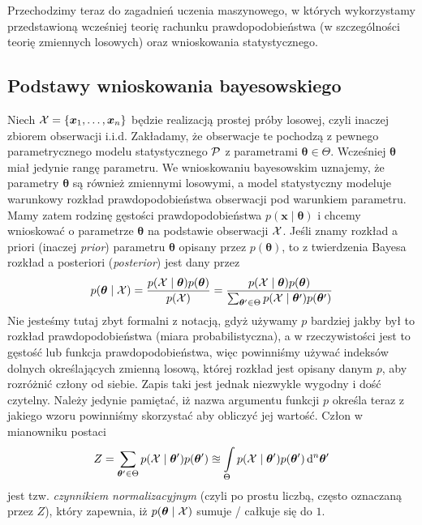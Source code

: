 \documentclass{myclass}
\numberwithin{equation}{subsection}
\begin{document}
Przechodzimy teraz do zagadnień uczenia maszynowego, w których wykorzystamy przedstawioną wcześniej
teorię rachunku prawdopodobieństwa (w szczególności teorię zmiennych losowych) oraz wnioskowania
statystycznego.


\subsection{Podstawy wnioskowania bayesowskiego}

Niech \(\mathcal{X} = \{\bm{x}_1,\ldots,\bm{x}_n\}\) będzie realizacją prostej próby losowej, czyli
inaczej zbiorem obserwacji i.i.d. Zakładamy, że obserwacje te pochodzą z pewnego parametrycznego
modelu statystycznego \(\mathcal{P}\) z parametrami \(\bm{\theta} \in \Theta\). Wcześniej \(\bm{\theta}\)
miał jedynie rangę parametru. We wnioskowaniu bayesowskim uznajemy, że parametry \(\bm{\theta}\) są
również zmiennymi losowymi, a model statystyczny modeluje warunkowy rozkład prawdopodobieństwa
obserwacji pod warunkiem parametru. Mamy zatem rodzinę gęstości prawdopodobieństwa \(p(\bm{x} \mid
\bm{\theta})\) i chcemy wnioskować o parametrze \(\bm{\theta}\) na podstawie obserwacji \(\mathcal{X}\).
Jeśli znamy rozkład a priori (inaczej \emph{prior}) parametru \(\bm{\theta}\) opisany przez
\(p(\bm{\theta})\), to z twierdzenia Bayesa rozkład a posteriori (\emph{posterior}) jest dany przez
\begin{equation}
    p(\bm{\theta} \mid \mathcal{X}) = \frac{p(\mathcal{X} \mid \bm{\theta}) p(\bm{\theta})}{p(\mathcal{X})} = \frac{p(\mathcal{X} \mid \bm{\theta}) p(\bm{\theta})}{\sum_{\bm{\theta}' \in \Theta} p(\mathcal{X} \mid \bm{\theta}') p(\bm{\theta}')}
\end{equation}
Nie jesteśmy tutaj zbyt formalni z notacją, gdyż używamy \(p\) bardziej jakby był to rozkład
prawdopodobieństwa (miara probabilistyczna), a w rzeczywistości jest to gęstość lub funkcja
prawdopodobieństwa, więc powinniśmy używać indeksów dolnych określających zmienną losową, której
rozkład jest opisany danym \(p\), aby rozróżnić człony od siebie. Zapis taki jest jednak niezwykle
wygodny i dość czytelny. Należy jedynie pamiętać, iż nazwa argumentu funkcji \(p\) określa teraz z
jakiego wzoru powinniśmy skorzystać aby obliczyć jej wartość. Człon w mianowniku postaci
\begin{equation}
     Z = \sum_{\bm{\theta}' \in \Theta} p(\mathcal{X} \mid \bm{\theta}') p (\bm{\theta}') \approxeq \int\limits_\Theta p(\mathcal{X} \mid \bm{\theta}') p (\bm{\theta}') \dd[n]{\bm{\theta}'}
\end{equation}
jest tzw. \emph{czynnikiem normalizacyjnym} (czyli po prostu liczbą, często oznaczaną przez \(Z\)),
który zapewnia, iż \(p(\bm{\theta} \mid \mathcal{X})\) sumuje / całkuje się do \(1\).
\end{document}
